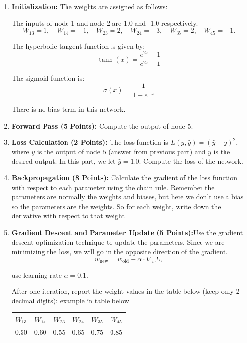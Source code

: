 \documentclass{article}
\begin{document}
\begin{enumerate}
\item \textbf{Initialization: } 
The weights are assigned as follows:


The inputs of node 1 and node 2 are 1.0 and -1.0 respectively.
\[
W_{13} = 1, \quad W_{14} = -1, \quad W_{23} = 2, \quad W_{24} = -3, \quad W_{35} = 2, \quad W_{45} = -1.
\]

The hyperbolic tangent function is given by:
\[
\tanh(x) = \frac{e^{2x} - 1}{e^{2x} + 1}
\]

The sigmoid function is:
\[
\sigma(x) = \frac{1}{1 + e^{-x}}
\]

There is no bias term in this network.


    \item \textbf{Forward Pass (5 Points):} Compute the output of node 5.
    \item \textbf{Loss Calculation (2 Points):} The loss function is $L(y, \hat{y}) = (\hat{y} - y)^2$, where $y$ is the output of node 5 (answer from previous part) and $\hat{y}$ is the desired output. In this part, we let $\hat{y} = 1.0$. Compute the loss of the network.
    \item \textbf{Backpropagation (8 Points):} Calculate the gradient of the loss function with respect to each parameter
using the chain rule. Remember the parameters are normally the weights and biases, but here we
don’t use a bias so the parameters are the weights. So for each weight, write down the derivative with
respect to that weight
    \item \textbf{Gradient Descent and Parameter Update (5 Points):}Use the gradient descent optimization
technique to update the parameters. Since we are minimizing the loss, we will go in the opposite
direction of the gradient.
    \[
    w_{\text{new}} = w_{\text{old}} - \alpha \cdot \nabla_w L,
    \]
    
    use learning rate $\alpha = 0.1$. 
    
    After one iteration, report the weight values in the table below (keep only 2 decimal digits): example
in table below
    \begin{center}
        \begin{tabular}{|c|c|c|c|c|c|}
        \hline
        $W_{13}$ & $W_{14}$ & $W_{23}$ & $W_{24}$ & $W_{35}$ & $W_{45}$ \\ \hline
        0.50    & 0.60    & 0.55    & 0.65    & 0.75    & 0.85    \\ \hline
        \end{tabular}
    \end{center}
\end{enumerate}
\end{document}
